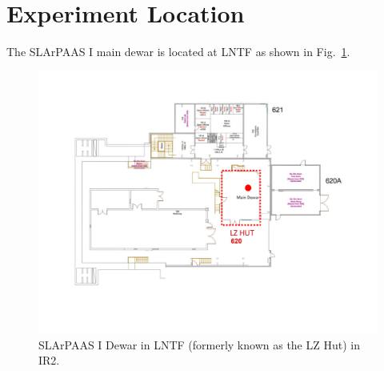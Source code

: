 \section{Experiment Location}
\label{sec:location}

The SLArPAAS I main dewar is located at LNTF as shown in Fig.~\ref{fig:IR2Layout}.

\begin{figure}[h]
    \centering
    \includegraphics[width=\textwidth]{fig/IR2Layout.pdf}
    \caption{SLArPAAS I Dewar in LNTF (formerly known as the LZ Hut) in IR2.}
    \label{fig:IR2Layout}
\end{figure}
